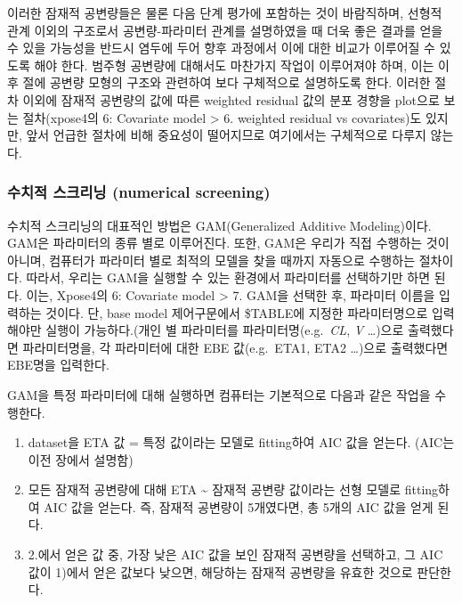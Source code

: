 \documentclass[
  10pt,
  krantz2,
  a4paper]{krantz}
\providecommand{\tightlist}{%
  \setlength{\itemsep}{0pt}\setlength{\parskip}{0pt}}
\theoremstyle{definition}
\theoremstyle{definition}
\theoremstyle{definition}
\theoremstyle{remark}
\begin{document}
이러한 잠재적 공변량들은 물론 다음 단계 평가에 포함하는 것이 바람직하며, 선형적 관계 이외의 구조로서 공변량-파라미터 관계를 설명하였을 때 더욱 좋은 결과를 얻을 수 있을 가능성을 반드시 염두에 두어 향후 과정에서 이에 대한 비교가 이루어질 수 있도록 해야 한다. 범주형 공변량에 대해서도 마찬가지 작업이 이루어져야 하며, 이는 이후 절에 공변량 모형의 구조와 관련하여 보다 구체적으로 설명하도록 한다. 이러한 절차 이외에 잠재적 공변량의 값에 따른 weighted residual 값의 분포 경향을 plot으로 보는 절차(xpose4의 6: Covariate model \textgreater{} 6. weighted residual vs covariates)도 있지만, 앞서 언급한 절차에 비해 중요성이 떨어지므로 여기에서는 구체적으로 다루지 않는다.

\hypertarget{uxc218uxce58uxc801-uxc2a4uxd06cuxb9acuxb2dd-numerical-screening}{%
\subsubsection{수치적 스크리닝 (numerical screening)}\label{uxc218uxce58uxc801-uxc2a4uxd06cuxb9acuxb2dd-numerical-screening}}


수치적 스크리닝의 대표적인 방법은 GAM(Generalized Additive Modeling)이다. GAM은 파라미터의 종류 별로 이루어진다. 또한, GAM은 우리가 직접 수행하는 것이 아니며, 컴퓨터가 파라미터 별로 최적의 모델을 찾을 때까지 자동으로 수행하는 절차이다. 따라서, 우리는 GAM을 실행할 수 있는 환경에서 파라미터를 선택하기만 하면 된다. 이는, Xpose4의 6: Covariate model \textgreater{} 7. GAM을 선택한 후, 파라미터 이름을 입력하는 것이다. 단, base model 제어구문에서 \$TABLE에 지정한 파라미터명으로 입력해야만 실행이 가능하다.(개인 별 파라미터를 파라미터명(e.g.~\emph{CL}, \emph{V} \ldots)으로 출력했다면 파라미터명을, 각 파라미터에 대한 EBE 값(e.g.~ETA1, ETA2 \ldots)으로 출력했다면 EBE명을 입력한다.

GAM을 특정 파라미터에 대해 실행하면 컴퓨터는 기본적으로 다음과 같은 작업을 수행한다.

\begin{enumerate}
\def\labelenumi{\arabic{enumi}.}
\tightlist
\item
  dataset을 ETA 값 = 특정 값이라는 모델로 fitting하여 AIC 값을 얻는다. (AIC는 이전 장에서 설명함)
\item
  모든 잠재적 공변량에 대해 ETA \textasciitilde{} 잠재적 공변량 값이라는 선형 모델로 fitting하여 AIC 값을 얻는다. 즉, 잠재적 공변량이 5개였다면, 총 5개의 AIC 값을 얻게 된다.
\item
  2.에서 얻은 값 중, 가장 낮은 AIC 값을 보인 잠재적 공변량을 선택하고, 그 AIC 값이 1)에서 얻은 값보다 낮으면, 해당하는 잠재적 공변량을 유효한 것으로 판단한다.
\end{enumerate}
\end{document}
